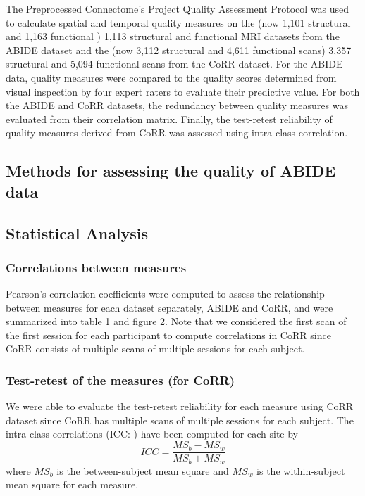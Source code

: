 
The Preprocessed Connectome’s Project Quality Assessment Protocol was used to calculate spatial and temporal quality measures on the (now 1,101 structural and 1,163 functional ) 1,113 structural and functional MRI datasets from the ABIDE dataset and the (now 3,112 structural and 4,611 functional scans) 3,357 structural and 5,094 functional scans from the CoRR dataset. For the ABIDE data, quality measures were compared to the quality scores determined from visual inspection by four expert raters to evaluate their predictive value. For both the ABIDE and CoRR datasets, the redundancy between quality measures was evaluated from their correlation matrix. Finally, the test-retest reliability of quality measures derived from CoRR was assessed using intra-class correlation.

\subsection{Methods for assessing the quality of ABIDE data}
\label{sec:23}

\subsection{Statistical Analysis}
\label{sec:24}

\subsubsection{Correlations between measures}
\label{sec:25}
Pearson’s correlation coefficients were computed to assess the relationship between measures for each dataset separately, ABIDE and CoRR, and were summarized into table 1 and figure 2. Note that we considered the first scan of the first session for each participant to compute correlations in CoRR since CoRR consists of multiple scans of multiple sessions for each subject.

\subsubsection{Test-retest of the measures (for CoRR)}
\label{sec:26}
We were able to evaluate the test-retest reliability for each measure using CoRR dataset since CoRR has multiple scans of multiple sessions for each subject. The intra-class correlations (ICC: \cite{Shrout79}) have been computed for each site by
\begin{equation}
ICC = \frac{MS_b - MS_w} {MS_b + MS_w}
\end{equation}
where $MS_b$ is the between-subject mean square and $MS_w$ is the within-subject mean square for each measure.


